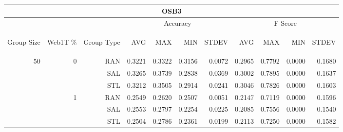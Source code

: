 \begin{center}
\begin{table}[htbp]
\begin{tabular}{ | r | r | r | r | r | r | r | r | r | r | r |}
\hline
\multicolumn{11}{|c|}{OSB3}\\
\hline
 & & & \multicolumn{4}{|c|}{Accuracy} & \multicolumn{4}{|c|}{F-Score}\\ \cline{4-11}
\begin{sideways}Group Size\end{sideways} & \begin{sideways}Web1T \%\end{sideways} & \begin{sideways}Group Type\end{sideways} & \begin{sideways}AVG\end{sideways} & \begin{sideways}MAX\end{sideways} & \begin{sideways}MIN\end{sideways} & \begin{sideways}STDEV\end{sideways} & \begin{sideways}AVG\end{sideways} & \begin{sideways}MAX\end{sideways} & \begin{sideways}MIN\end{sideways} & \begin{sideways}STDEV\end{sideways}\\
\hline
\multirow{18}{*}{50}
 & \multirow{3}{*}{0} & RAN & 0.3221 & 0.3322 & 0.3156 & 0.0072 & 0.2965 & 0.7792 & 0.0000 & 0.1680\\ \cline{3-11}
 &   & SAL & 0.3265 & 0.3739 & 0.2838 & 0.0369 & 0.3002 & 0.7895 & 0.0000 & 0.1637\\ \cline{3-11}
 &   & STL & 0.3212 & 0.3505 & 0.2914 & 0.0241 & 0.3046 & 0.7826 & 0.0000 & 0.1603\\ \cline{2-11}
 & \multirow{3}{*}{1} & RAN & 0.2549 & 0.2620 & 0.2507 & 0.0051 & 0.2147 & 0.7119 & 0.0000 & 0.1596\\ \cline{3-11}
 &   & SAL & 0.2553 & 0.2797 & 0.2254 & 0.0225 & 0.2085 & 0.7556 & 0.0000 & 0.1540\\ \cline{3-11}
 &   & STL & 0.2504 & 0.2786 & 0.2361 & 0.0199 & 0.2113 & 0.7250 & 0.0000 & 0.1582\\ \cline{2-11}

\end{tabular}
\end{table}
\end{center}
